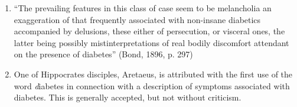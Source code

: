 \documentclass[12pt]{article}
\begin{document}
\begin{enumerate}
\item ``The prevailing features in this class of case seem to be melancholia \textemdash an exaggeration of that frequently associated with non-insane diabetics \textemdash accompanied by delusions, these either of persecution, or visceral ones, the latter being possibly mistinterpretations of real bodily discomfort attendant on the presence of diabetes'' (Bond, 1896, p. 297)



\item \citep{major_1933_classic}
One of Hippocrates disciples, Aretaeus, is attributed with the first use of the word \textit diabetes in connection with a description of symptoms associated with diabetes. This is generally accepted, but not without criticism. 


\end{enumerate}
\end{document}
